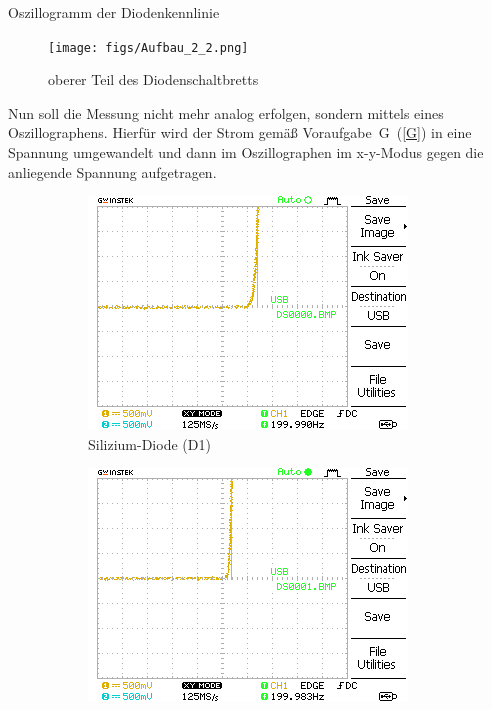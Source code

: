 \documentclass{article}
\theoremstyle{definition}
\begin{document}
\begin{aufgabe}{Oszillogramm der Diodenkennlinie}
    \aufbau
    \begin{figure}[H]
        \centering
        \texttt{[image: figs/Aufbau\_2\_2.png]}
        \caption{oberer Teil des Diodenschaltbretts\cite{anleitung}}
        \label{aufbau_2_2}
    \end{figure}
Nun soll die Messung nicht mehr analog erfolgen, sondern mittels eines Oszillographens. Hierfür wird der Strom gemäß Voraufgabe~G~(\ref{G}) in eine Spannung umgewandelt und dann im Oszillographen im x-y-Modus gegen die anliegende Spannung aufgetragen.
    \messwerte 
    \begin{figure}[H]
        \centering
        \begin{subfigure}[b]{0.45 \textwidth}
            \includegraphics[width=\textwidth]{MesswerteVersuch2/m2_0.png}
            \caption{Silizium-Diode (D1)}
            \label{a2_0}
        \end{subfigure}
        \hfill
        \begin{subfigure}[b]{0.45 \textwidth}
            \includegraphics[width=\textwidth]{MesswerteVersuch2/m2_1.png}

\end{subfigure}
\end{figure}
\end{aufgabe}
\end{document}
